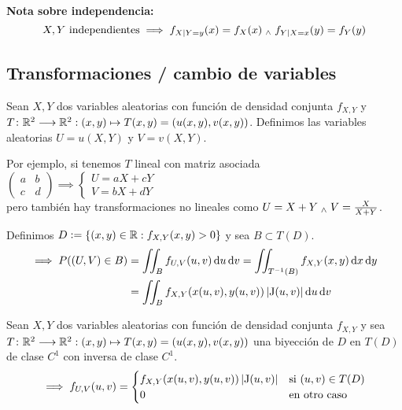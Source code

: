 \textbf{Nota sobre independencia:}
\[X, Y \text{ independientes} \implies f_{X|Y=y}(x) = f_X(x) \; _{\wedge} \; f_{Y|X=x}(y) = f_Y(y)\]

\subsection{Transformaciones / cambio de variables}

Sean $X, Y$ dos variables aleatorias con función de densidad conjunta $f_{X, Y}$ y $T \colon \mathbb{R}^2 \longrightarrow \mathbb{R}^2 : (x, y) \mapsto T(x, y) = (u(x, y), v(x, y))$. Definimos las variables aleatorias $U = u(X, Y)$ y $V = v(X, Y)$.

Por ejemplo, si tenemos $T$ lineal con matriz asociada $\begin{pmatrix}
		a & b \\
		c & d
	\end{pmatrix} \implies \begin{cases}
		U = aX + cY \\
		V = bX + dY
	\end{cases}$ \\pero también hay transformaciones no lineales como $U = X + Y \; _{\wedge} \; V = \frac{X}{X+Y}$.

Definimos $D\vcentcolon= \{(x, y) \in \mathbb{R} : f_{X, Y}(x, y) > 0\}$ y sea $B \subset T(D)$.
\[\begin{aligned}
		\implies P((U, V) \in B) & = \iint_B f_{U, V}(u, v) \odif{u} \odif{v} = \iint_{T^{-1}(B)} f_{X, Y}(x, y) \odif{x} \odif{y} \\
		                         & = \iint_{B} f_{X, Y}(x(u, v), y(u, v)) \abs{\operatorname{J}(u, v)} \odif{u} \odif{v}
	\end{aligned}\]

\begin{teo}
	Sean $X, Y$ dos variables aleatorias con función de densidad conjunta $f_{X, Y}$ y sea $T \colon \mathbb{R}^2 \longrightarrow \mathbb{R}^2 : (x, y) \mapsto T(x, y) = (u(x, y), v(x, y))$ una biyección de $D$ en $T(D)$ de clase $C^1$ con inversa de clase $C^1$.
	\[\implies f_{U, V}(u, v) = \begin{cases}
			f_{X, Y}(x(u, v), y(u, v)) \left|\operatorname{J}(u, v)\right| & \text{si } (u, v) \in T(D) \\
			0                                                       & \text{en otro caso}
		\end{cases}\]
\end{teo}


